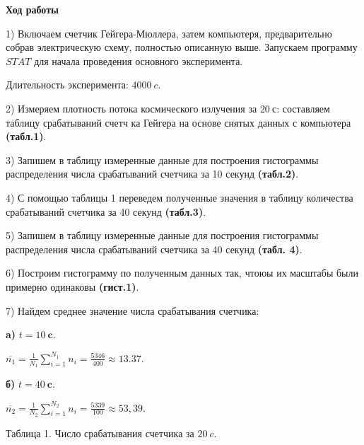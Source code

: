\documentclass[a4paper,12pt]{article} %
\begin{document}
{\bf Ход работы}

1) Включаем счетчик Гейгера-Мюллера, затем компьютеря, предварительно собрав электрическую схему, полностью описанную выше. Запускаем программу $STAT$ для начала проведения основного эксперимента.

Длительность эксперимента: $4000\ c$.

2) Измеряем плотность потока космического излучения за $20\ с$: составляем таблицу срабатываний счетч ка Гейгера на основе снятых данных с компьютера {\bf (табл.1)}.

3) Запишем в таблицу измеренные данные для построения гистограммы распределения числа срабатываний счетчика за 10 секунд {\bf (табл.2)}.

4) С помощью таблицы 1 переведем полученные значения в таблицу количества срабатываний счетчика за 40 секунд {\bf (табл.3)}.

5) Запишем в таблицу измеренные данные для построения гистограммы распределения числа срабатываний счетчика за 40 секунд {\bf (табл. 4)}.

6) Построим гистограмму по полученным данных так, чтоюы их масштабы были примерно одинаковы {\bf (гист.1)}.

7) Найдем среднее значение числа срабатывания счетчика:

{\bf a)} $t = 10\ \textbf{c}$.

$\overline{n_1} = \frac{1}{N_1}\sum\limits_{i = 1}^{N_1}n_i = \frac{5346}{400} \approx 13.37$.

\hspace{1mm}

{\bf б)} $t = 40\ \textbf{c}$.

$\overline{n_2} = \frac{1}{N_2}\sum\limits_{i = 1}^{N_2}n_i = \frac{5339}{100} \approx 53,39$.

Таблица 1. Число срабатывания счетчика за $20\ c$.
\end{document}
